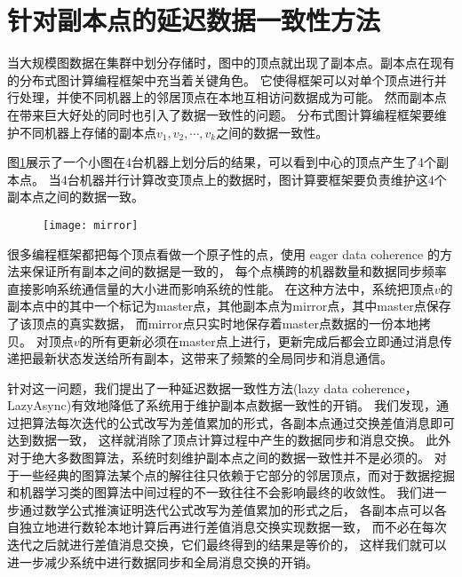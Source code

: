 \section{针对副本点的延迟数据一致性方法}

当大规模图数据在集群中划分存储时，图中的顶点就出现了副本点。副本点在现有的分布式图计算编程框架中充当着关键角色。
它使得框架可以对单个顶点进行并行处理，并使不同机器上的邻居顶点在本地互相访问数据成为可能。
然而副本点在带来巨大好处的同时也引入了数据一致性的问题。\cite{Wang@PPoPP18, zlj2018}
分布式图计算编程框架要维护不同机器上存储的副本点$v_1, v_2, \cdots, v_k$之间的数据一致性。

图\ref{fig:mirror}展示了一个小图在4台机器上划分后的结果，可以看到中心的顶点产生了4个副本点。
当4台机器并行计算改变顶点上的数据时，图计算要框架要负责维护这4个副本点之间的数据一致。

\begin{figure}[!htbp]
  \centering
  \texttt{[image: mirror]}
  \label{fig:mirror}
\end{figure}


很多编程框架都把每个顶点看做一个原子性的点，使用 eager data coherence 的方法来保证所有副本之间的数据是一致的，
每个点横跨的机器数量和数据同步频率直接影响系统通信量的大小进而影响系统的性能。
在这种方法中，系统把顶点$v$的副本点中的其中一个标记为master点，其他副本点为mirror点，其中master点保存了该顶点的真实数据，
而mirror点只实时地保存着master点数据的一份本地拷贝。
对顶点$v$的所有更新必须在master点上进行，更新完成后都会立即通过消息传递把最新状态发送给所有副本，这带来了频繁的全局同步和消息通信。

针对这一问题，我们提出了一种延迟数据一致性方法(lazy data coherence，LazyAsync)\cite{Wang@PPoPP18}有效地降低了系统用于维护副本点数据一致性的开销。
我们发现，通过把算法每次迭代的公式改写为差值累加的形式，各副本点通过交换差值消息即可达到数据一致，
这样就消除了顶点计算过程中产生的数据同步和消息交换。
此外对于绝大多数图算法，系统时刻维护副本点之间的数据一致性并不是必须的。
对于一些经典的图算法某个点的解往往只依赖于它部分的邻居顶点，而对于数据挖掘和机器学习类的图算法中间过程的不一致往往不会影响最终的收敛性。
我们进一步通过数学公式推演证明迭代公式改写为差值累加的形式之后，
各副本点可以各自独立地进行数轮本地计算后再进行差值消息交换实现数据一致，
而不必在每次迭代之后就进行差值消息交换，它们最终得到的结果是等价的，
这样我们就可以进一步减少系统中进行数据同步和全局消息交换的开销。

